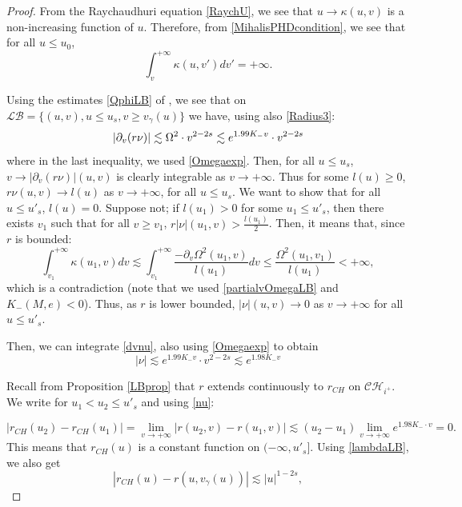 \documentclass[10pt,a4paper]{article}
\theoremstyle{plain}
\theoremstyle{remark}
\theoremstyle{definition}
\theoremstyle{plain}
\theoremstyle{remark}
\theoremstyle{definition}
\newcommand{\LB}{\mathcal{LB}}
\newcommand{\CH}{\mathcal{CH}_{i^+}}
\numberwithin{equation}{section}
\begin{document}
\begin{proof}
	From the Raychaudhuri equation \eqref{RaychU}, we see that $u \rightarrow \kappa(u,v)$ is a non-increasing function of $u$. Therefore, from \eqref{MihalisPHDcondition}, we see that for all $u \leq u_0$, \begin{equation} 	\int_{v}^{+\infty} \kappa(u,v')dv' = +\infty.\end{equation} 
	
	Using the estimates \eqref{QphiLB} of \cite{Moi}, we see that on $\LB=\{ (u,v), u \leq u_s, v \geq v_{\gamma}(u) \}$ we have, using also \eqref{Radius3}: \begin{equation} \label{dvnu}
	|\partial_v(r \nu)| \lesssim \Omega^2 \cdot v^{2-2s}  \lesssim e^{1.99 K_- v} \cdot v^{2-2s} \color{black}
	\end{equation} where in the last inequality, we used \eqref{Omegaexp}.
 	Then, for all $u \leq u_s$, $ v \rightarrow |\partial_v(r \nu)|(u,v)$ is clearly integrable as $v \rightarrow +\infty$. Thus for some $l(u) \geq 0$, $r \nu(u,v) \rightarrow l(u)$ as $v \rightarrow +\infty$, for all $u \leq u_s$. We want to show that for all $u \leq u'_s$, $l(u)=0$. Suppose not; if $l(u_1)>0$ for some $u_1 \leq u'_s$, then there exists $v_1$ such that for all $v \geq v_1$, $r |\nu|(u_1,v)>\frac{l(u_1)}{2}$. Then, it means that, since $r$ is bounded: $$ \int_{v_1}^{+\infty}\kappa(u_1,v)dv \lesssim  \int_{v_1}^{+\infty}\frac{-\partial_v \Omega^2(u_1,v)}{l(u_1)} dv  \leq \frac{\Omega^2(u_1,v_1)}{l(u_1)}<+\infty,$$ which is a contradiction (note that we used \eqref{partialvOmegaLB} and $K_-(M,e)<0$)\color{black}. Thus, as $r$ is lower bounded, $|\nu|(u,v) \rightarrow 0$ as $v\rightarrow+\infty$ for all $u \leq u'_s$.
	
	Then, we can integrate \eqref{dvnu}, also using \eqref{Omegaexp} to obtain \begin{equation} \label{nu}
	|\nu| \lesssim e^{1.99 K_- v} \cdot v^{2-2s}  \lesssim  e^{1.98 K_- v}
	\end{equation}
	
	Recall from Proposition \ref{LBprop} that $r$ extends continuously to $r_{CH}$ on $\CH$. We write for $u_1<u_2 \leq u'_s$ and using \eqref{nu}: 
	
	$$ |r_{CH}(u_2)-r_{CH}(u_1)|= \lim_{v \rightarrow +\infty} |r(u_2,v)-r(u_1,v)| \lesssim (u_2-u_1)  \lim_{v \rightarrow +\infty}e^{1.98 K_- \cdot v}=0.$$ This means that $r_{CH}(u)$ is a constant function on $(-\infty,u'_s]$. Using \eqref{lambdaLB}, we also get $$ |r_{CH}(u)-r(u,v_{\gamma}(u))| \lesssim |u|^{1-2s},$$
	

\end{proof}
\end{document}
